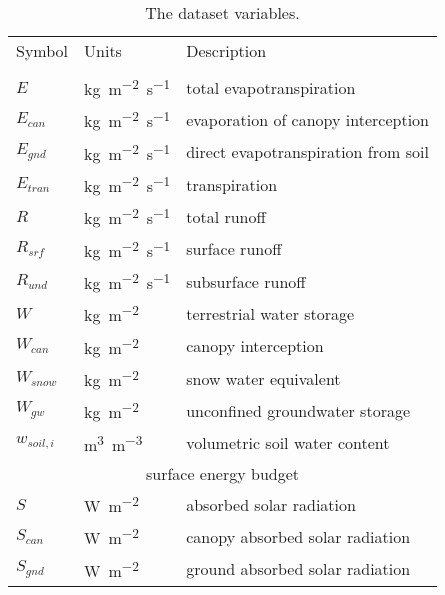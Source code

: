 \documentclass[essd]{copernicus}
\begin{document}
\begin{table}[t]
    \caption{The dataset variables.}
    \label{tbl:variables}
    \centering
    \begin{tabular}{lll}
        \tophline
        Symbol       & Units                   & Description                               \\
        \middlehline
        \multicolumn{3}{c}{surface water budget}                                           \\
        $E$          & \unit{kg~m^{-2}~s^{-1}} & total evapotranspiration                  \\
        $E_{can}$    & \unit{kg~m^{-2}~s^{-1}} & evaporation of canopy interception        \\
        $E_{gnd}$    & \unit{kg~m^{-2}~s^{-1}} & direct evapotranspiration from soil       \\
        $E_{tran}$   & \unit{kg~m^{-2}~s^{-1}} & transpiration                             \\
        $R$          & \unit{kg~m^{-2}~s^{-1}} & total runoff                              \\
        $R_{srf}$    & \unit{kg~m^{-2}~s^{-1}} & surface runoff                            \\
        $R_{und}$    & \unit{kg~m^{-2}~s^{-1}} & subsurface runoff                         \\
        $W$          & \unit{kg~m^{-2}}        & terrestrial water storage                 \\
        $W_{can}$    & \unit{kg~m^{-2}}        & canopy interception                       \\
        $W_{snow}$   & \unit{kg~m^{-2}}        & snow water equivalent                     \\
        $W_{gw}$     & \unit{kg~m^{-2}}        & unconfined groundwater storage            \\
        $w_{soil,i}$ & \unit{m^3~m^{-3}}       & volumetric soil water content             \\
        [1mm]
        \multicolumn{3}{c}{surface energy budget}                                          \\
        $S$          & \unit{W~m^{-2}}         & absorbed solar radiation                  \\
        $S_{can}$    & \unit{W~m^{-2}}         & canopy absorbed solar radiation           \\
        $S_{gnd}$    & \unit{W~m^{-2}}         & ground absorbed solar radiation           \\

\end{tabular}
\end{table}
\end{document}

